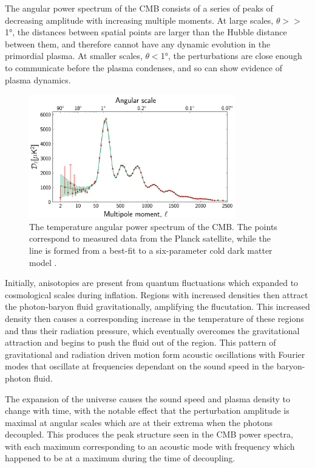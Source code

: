 The angular power spectrum of the CMB consists of a series of peaks of decreasing amplitude with increasing multiple moments. 
At large scales, $\theta >> $\ang{1}, the distances between spatial points are larger than the Hubble distance between them, and therefore cannot have any dynamic evolution in the primordial plasma.
At smaller scales, $\theta < $\ang{1}, the perturbations are close enough to communicate before the plasma condenses, and so can show evidence of plasma dynamics.

\begin{figure}[htpb]
	\label{fig:CMBpowerSpectrum}
	\centering
	\includegraphics[width=0.8\textwidth]{figures/cmb_power_spectrum.png}
	\caption[The temperature angular power spectrum of the CMB]{The temperature angular power spectrum of the CMB. The points correspond to measured data from the Planck satellite, while the line is formed from a best-fit to a six-parameter cold dark matter model \cite{PlanckCMB}.}
\end{figure}

Initially, anisotopies are present from quantum fluctuations which expanded to cosmological scales during inflation.
Regions with increased densities then attract the photon-baryon fluid gravitationally, amplifying the flucutation.
This increased density then causes a corresponding increase in the temperature of these regions and thus their radiation pressure, which eventually overcomes the gravitational attraction and begins to push the fluid out of the region. 
This pattern of gravitational and radiation driven motion form acoustic oscillations with Fourier modes that oscillate at frequencies dependant on the sound speed in the baryon-photon fluid.

The expansion of the universe causes the sound speed and plasma density to change with time, with the notable effect that the perturbation amplitude is maximal at angular scales which are at their extrema when the photons decoupled. 
This produces the peak structure seen in the CMB power spectra, with each maximum corresponding to an acoustic mode with frequency which happened to be at a maximum during the time of decoupling.

